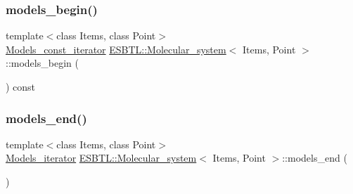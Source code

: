 \mbox{\label{group__grp__iters_gae69a995db286b769fe7a8ae57658eb17}} 
\subsubsection{\texorpdfstring{models\+\_\+begin()}{models\_begin()}\hspace{0.1cm}{\footnotesize\ttfamily [2/2]}}
{\footnotesize\ttfamily template$<$class Items, class Point$>$ \\
\hyperlink{group__grp__iters_ga6383c53b86af7a7a7376bce06e4febb8}{Models\+\_\+const\+\_\+iterator} \hyperlink{classESBTL_1_1Molecular__system}{E\+S\+B\+T\+L\+::\+Molecular\+\_\+system}$<$ Items, Point $>$\+::models\+\_\+begin (\begin{DoxyParamCaption}{ }\end{DoxyParamCaption}) const\hspace{0.3cm}{\ttfamily [inline]}}

\mbox{\label{group__grp__iters_ga16244782639e3a6183da4a722162d534}} 
\subsubsection{\texorpdfstring{models\+\_\+end()}{models\_end()}\hspace{0.1cm}{\footnotesize\ttfamily [1/2]}}
{\footnotesize\ttfamily template$<$class Items, class Point$>$ \\
\hyperlink{group__grp__iters_ga752760df14baf1b92dac469d712202bc}{Models\+\_\+iterator} \hyperlink{classESBTL_1_1Molecular__system}{E\+S\+B\+T\+L\+::\+Molecular\+\_\+system}$<$ Items, Point $>$\+::models\+\_\+end (\begin{DoxyParamCaption}{ }\end{DoxyParamCaption})\hspace{0.3cm}{\ttfamily [inline]}}

\mbox{\label{group__grp__iters_gab880e831a7b87fafec9ddf2e569b4cba}} 
